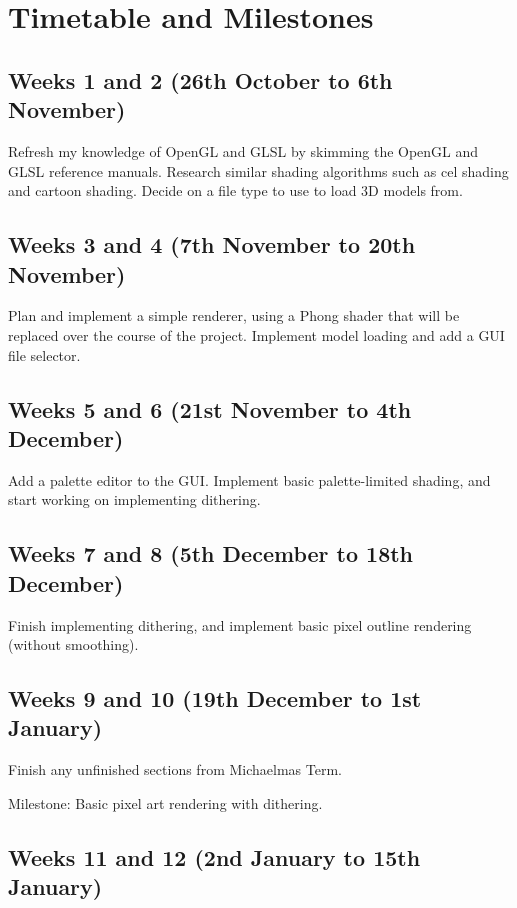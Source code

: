 \documentclass[12pt]{article}
\begin{document}
\section*{Timetable and Milestones}

\subsection*{Weeks 1 and 2 (26th October to 6th November)}

Refresh my knowledge of OpenGL and GLSL by skimming the OpenGL and GLSL reference manuals. Research similar shading algorithms such as cel shading and cartoon shading. Decide on a file type to use to load 3D models from.

\subsection*{Weeks 3 and 4 (7th November to 20th November)}

Plan and implement a simple renderer, using a Phong shader that will be replaced over the course of the project. Implement model loading and add a GUI file selector.

\subsection*{Weeks 5 and 6 (21st November to 4th December)}

Add a palette editor to the GUI. Implement basic palette-limited shading, and start working on implementing dithering.

\subsection*{Weeks 7 and 8 (5th December to 18th December)}

Finish implementing dithering, and implement basic pixel outline rendering (without smoothing).

\subsection*{Weeks 9 and 10 (19th December to 1st January)}

Finish any unfinished sections from Michaelmas Term.

Milestone: Basic pixel art rendering with dithering.

\subsection*{Weeks 11 and 12 (2nd January to 15th January)}
\end{document}
